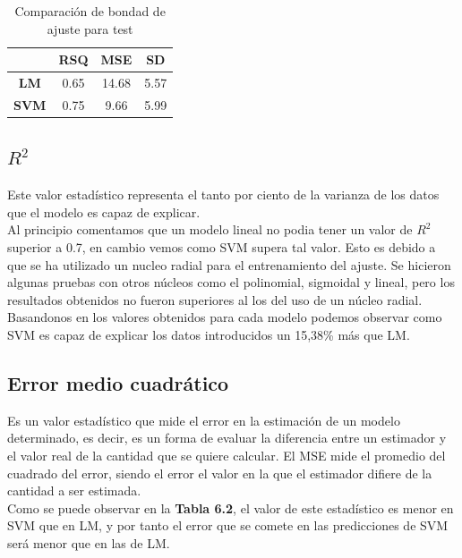 \begin{table}[H]
\label{vetest} 
\begin{center}\begin{tabular}{|c|c|c|c|}
\hline
	 & \textbf{RSQ} & \textbf{MSE} & \textbf{SD}\\
\hline
	\textbf{LM} & 0.65 & 14.68 & 5.57\\
\hline
	\textbf{SVM} & 0.75 & 9.66 & 5.99\\
\hline
\end{tabular}\end{center}\centering
\caption{Comparación de bondad de ajuste para test}
\end{table}

\subsection{$R^{2}$}

	Este valor estadístico representa el tanto por ciento de la varianza de los datos que el modelo es capaz de explicar. \\
	
	Al principio comentamos que un modelo lineal no podia tener un valor de $R^{2}$ superior a 0.7, en cambio vemos como SVM supera tal valor. Esto es debido a que se ha utilizado un nucleo radial para el entrenamiento del ajuste. Se hicieron algunas pruebas con otros núcleos como el polinomial, sigmoidal y lineal, pero los resultados obtenidos no fueron superiores al los del uso de un núcleo radial.\\
	
	Basandonos en los valores obtenidos para cada modelo podemos observar como SVM es capaz de explicar los datos introducidos un 15,38\% más que LM.

\subsection{Error medio cuadrático}

	Es un valor estadístico que mide el error en la estimación de un modelo determinado, es decir, es un forma de evaluar la diferencia entre un estimador y el valor real de la cantidad que se quiere calcular. El MSE mide el promedio del cuadrado del error, siendo el error el valor en la que el estimador difiere de la cantidad a ser estimada.\\
	
	Como se puede observar en la \textbf{Tabla 6.2}, el valor de este estadístico es menor en SVM que en LM, y por tanto el error que se comete en las predicciones de SVM será menor que en las de LM.

